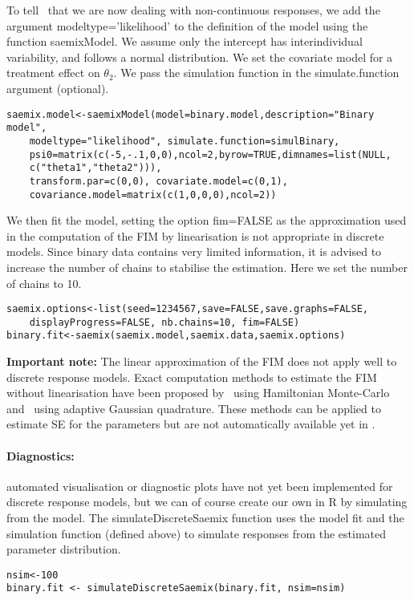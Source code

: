 To tell \monolix~that we are now dealing with non-continuous responses, we add the argument {\sf modeltype='likelihood'} to the definition of the model using the function {\sf saemixModel}. We assume only the intercept has interindividual variability, and follows a normal distribution. We set the covariate model for a treatment effect on $\theta_2$. We pass the simulation function in the {\sf simulate.function} argument (optional).
\begin{verbatim}
saemix.model<-saemixModel(model=binary.model,description="Binary model",
    modeltype="likelihood", simulate.function=simulBinary,
    psi0=matrix(c(-5,-.1,0,0),ncol=2,byrow=TRUE,dimnames=list(NULL,
    c("theta1","theta2"))),
    transform.par=c(0,0), covariate.model=c(0,1),
    covariance.model=matrix(c(1,0,0,0),ncol=2))
\end{verbatim}

We then fit the model, setting the option {\sf fim=FALSE} as the approximation used in the computation of the FIM by linearisation is not appropriate in discrete models. Since binary data contains very limited information, it is advised to increase the number of chains to stabilise the estimation. Here we set the number of chains to 10.
\begin{verbatim}
saemix.options<-list(seed=1234567,save=FALSE,save.graphs=FALSE, 
    displayProgress=FALSE, nb.chains=10, fim=FALSE)
binary.fit<-saemix(saemix.model,saemix.data,saemix.options)
\end{verbatim}

{\bf Important note:} The linear approximation of the FIM does not apply well to discrete response models. Exact computation methods to estimate the FIM without linearisation have been proposed by~\cite{Riviere16} using Hamiltonian Monte-Carlo and~\cite{Ueckert16} using adaptive Gaussian quadrature. These methods can be applied to estimate SE for the parameters but are not automatically available yet in \monolix.

\paragraph{Diagnostics:} automated visualisation or diagnostic plots have not yet been implemented for discrete response models, but we can of course create our own in R by simulating from the model. The {\sf simulateDiscreteSaemix} function uses the model fit and the simulation function (defined above) to simulate responses from the estimated parameter distribution.
\begin{verbatim}
nsim<-100
binary.fit <- simulateDiscreteSaemix(binary.fit, nsim=nsim)
\end{verbatim}

